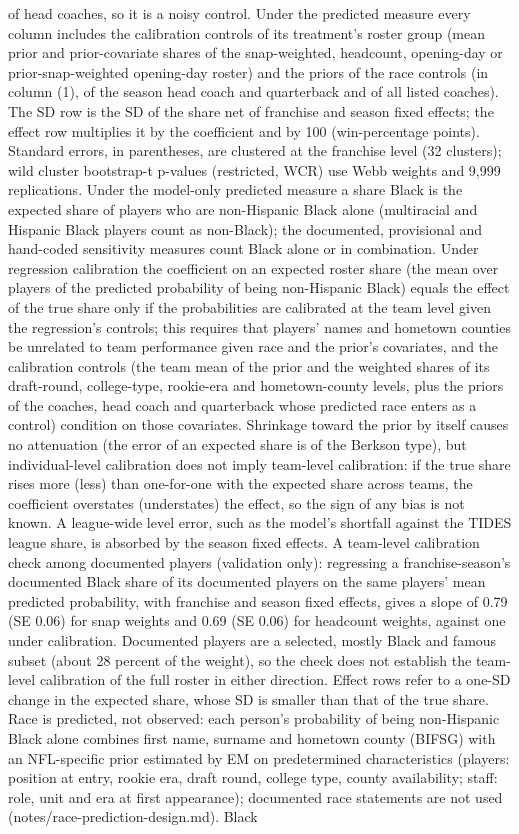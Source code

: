 {of head coaches, so it is a noisy control. Under the predicted measure every column includes the calibration controls of its treatment's roster group (mean prior and prior-covariate shares of the snap-weighted, headcount, opening-day or prior-snap-weighted opening-day roster) and the priors of the race controls (in column (1), of the season head coach and quarterback and of all listed coaches). The SD row is the SD of the share net of franchise and season fixed effects; the effect row multiplies it by the coefficient and by 100 (win-percentage points). Standard errors, in parentheses, are clustered at the franchise level (32 clusters); wild cluster bootstrap-t p-values (restricted, WCR) use Webb weights and 9,999 replications. Under the model-only predicted measure a share Black is the expected share of players who are non-Hispanic Black alone (multiracial and Hispanic Black players count as non-Black); the documented, provisional and hand-coded sensitivity measures count Black alone or in combination. Under regression calibration the coefficient on an expected roster share (the mean over players of the predicted probability of being non-Hispanic Black) equals the effect of the true share only if the probabilities are calibrated at the team level given the regression's controls; this requires that players' names and hometown counties be unrelated to team performance given race and the prior's covariates, and the calibration controls (the team mean of the prior and the weighted shares of its draft-round, college-type, rookie-era and hometown-county levels, plus the priors of the coaches, head coach and quarterback whose predicted race enters as a control) condition on those covariates. Shrinkage toward the prior by itself causes no attenuation (the error of an expected share is of the Berkson type), but individual-level calibration does not imply team-level calibration: if the true share rises more (less) than one-for-one with the expected share across teams, the coefficient overstates (understates) the effect, so the sign of any bias is not known. A league-wide level error, such as the model's shortfall against the TIDES league share, is absorbed by the season fixed effects. A team-level calibration check among documented players (validation only): regressing a franchise-season's documented Black share of its documented players on the same players' mean predicted probability, with franchise and season fixed effects, gives a slope of 0.79 (SE 0.06) for snap weights and  0.69 (SE 0.06) for headcount weights, against one under calibration. Documented players are a selected, mostly Black and famous subset (about 28 percent of the weight), so the check does not establish the team-level calibration of the full roster in either direction. Effect rows refer to a one-SD change in the expected share, whose SD is smaller than that of the true share. Race is predicted, not observed: each person's probability of being non-Hispanic Black alone combines first name, surname and hometown county (BIFSG) with an NFL-specific prior estimated by EM on predetermined characteristics (players: position at entry, rookie era, draft round, college type, county availability; staff: role, unit and era at first appearance); documented race statements are not used (notes/race-prediction-design.md). Black }

